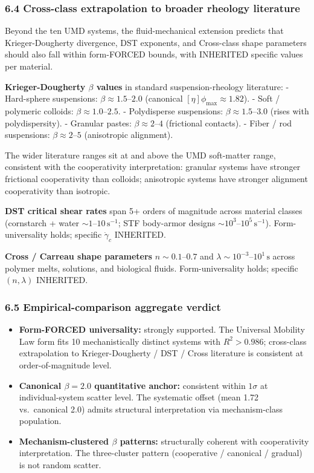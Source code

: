 \documentclass[
  11pt,a4paper]{article}
\providecommand{\tightlist}{%
  \setlength{\itemsep}{0pt}\setlength{\parskip}{0pt}}
\begin{document}
\subsubsection{6.4 Cross-class extrapolation to broader rheology
literature}\label{cross-class-extrapolation-to-broader-rheology-literature}

Beyond the ten UMD systems, the fluid-mechanical extension predicts that
Krieger-Dougherty divergence, DST exponents, and Cross-class shape
parameters should also fall within form-FORCED bounds, with INHERITED
specific values per material.

\textbf{Krieger-Dougherty \(\beta\) values} in standard
suspension-rheology literature: - Hard-sphere suspensions:
\(\beta \approx 1.5\)--\(2.0\) (canonical
\([\eta]\phi_\mathrm{max} \approx 1.82\)). - Soft / polymeric colloids:
\(\beta \approx 1.0\)--\(2.5\). - Polydisperse suspensions:
\(\beta \approx 1.5\)--\(3.0\) (rises with polydispersity). - Granular
pastes: \(\beta \approx 2\)--\(4\) (frictional contacts). - Fiber / rod
suspensions: \(\beta \approx 2\)--\(5\) (anisotropic alignment).

The wider literature ranges sit at and above the UMD soft-matter range,
consistent with the cooperativity interpretation: granular systems have
stronger frictional cooperativity than colloids; anisotropic systems
have stronger alignment cooperativity than isotropic.

\textbf{DST critical shear rates} span 5+ orders of magnitude across
material classes (cornstarch + water
\(\sim 1\)--\(10\,\mathrm{s}^{-1}\); STF body-armor designs
\(\sim 10^3\)--\(10^5\,\mathrm{s}^{-1}\)). Form-universality holds;
specific \(\dot\gamma_c\) INHERITED.

\textbf{Cross / Carreau shape parameters} \(n \sim 0.1\)--\(0.7\) and
\(\lambda \sim 10^{-3}\)--\(10^1\,\mathrm{s}\) across polymer melts,
solutions, and biological fluids. Form-universality holds; specific
\((n, \lambda)\) INHERITED.

\subsubsection{6.5 Empirical-comparison aggregate
verdict}\label{empirical-comparison-aggregate-verdict}

\begin{itemize}
\tightlist
\item
  \textbf{Form-FORCED universality:} strongly supported. The Universal
  Mobility Law form fits 10 mechanistically distinct systems with
  \(R^2 > 0.986\); cross-class extrapolation to Krieger-Dougherty / DST
  / Cross literature is consistent at order-of-magnitude level.
\item
  \textbf{Canonical \(\beta = 2.0\) quantitative anchor:} consistent
  within \(1\sigma\) at individual-system scatter level. The systematic
  offset (mean 1.72 vs.~canonical 2.0) admits structural interpretation
  via mechanism-class population.
\item
  \textbf{Mechanism-clustered \(\beta\) patterns:} structurally coherent
  with cooperativity interpretation. The three-cluster pattern
  (cooperative / canonical / gradual) is not random scatter.
\end{itemize}
\end{document}
